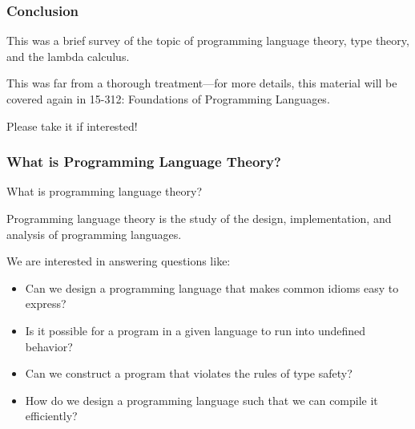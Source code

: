 \documentclass[aspectratio=169, handout]{beamer}
\begin{document}
\begin{frame}[fragile]
  \frametitle{Conclusion}

  This was a brief survey of the topic of programming language theory,
  type theory, and the lambda calculus.

  \pause
  \vspace{\fill}

  This was far from a thorough treatment---for more details, this
  material will be covered again in 15-312: Foundations of
  Programming Languages.

  \pause
  \vspace{\fill}

  Please take it if interested!
\end{frame}



\begin{frame}[fragile]
\frametitle{What is Programming Language Theory?}

What is programming language theory?

\pause
\vspace{\fill}

Programming language theory is the study of the design, implementation,
and analysis of programming languages.

\pause
\vspace{\fill}

We are interested in answering questions like:
\begin{itemize}
  \item Can we design a programming language that makes common
  idioms easy to express?
  \item Is it possible for a program in a given language to
  run into undefined behavior?
  \item Can we construct a program that violates the rules of
  type safety?
  \item How do we design a programming language such that we can
  compile it efficiently?
\end{itemize}
\end{frame}
\end{document}
